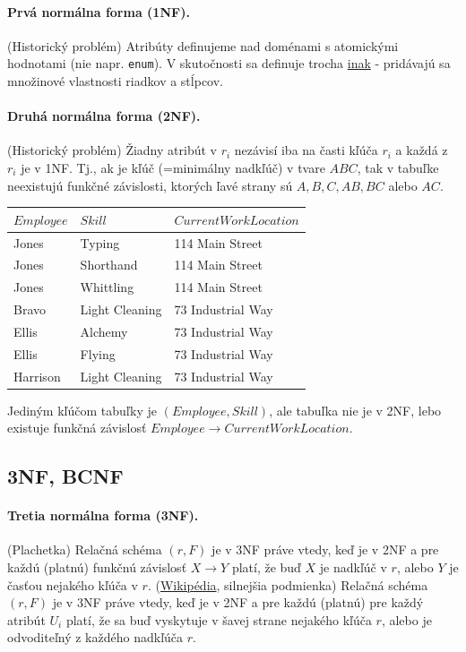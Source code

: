 \documentclass[10pt,a4paper]{article}
\begin{document}
\paragraph{Prvá normálna forma (1NF).} (Historický problém) Atribúty definujeme nad doménami s atomickými hodnotami (nie napr. \verb|enum|). V skutočnosti sa definuje trocha \href{http://en.wikipedia.org/wiki/First_normal_form}{inak} - pridávajú sa množinové vlastnosti riadkov a stĺpcov. 

\paragraph{Druhá normálna forma (2NF).} (Historický problém) Žiadny atribút v $r_i$ nezávisí iba na časti kľúča $r_i$ a každá z $r_i$ je v 1NF. Tj., ak je kľúč (=minimálny nadkľúč) v tvare $ABC$, tak v tabuľke neexistujú funkčné závislosti, ktorých ľavé strany sú $A,B,C,AB,BC$ alebo $AC$. 

\begin{center}
\begin{tabular}{l|l|l}
$Employee$ & $Skill$ & $Current Work Location$ \\
\hline
Jones &	Typing &	114 Main Street \\
Jones &	Shorthand &	114 Main Street \\
Jones &	Whittling &	114 Main Street \\
Bravo &	Light Cleaning &	73 Industrial Way \\
Ellis &	Alchemy &	73 Industrial Way \\
Ellis &	Flying &	73 Industrial Way \\
Harrison &	Light Cleaning &	73 Industrial Way \\
\end{tabular}
\end{center}

Jediným kľúčom tabuľky je $(Employee, Skill)$, ale tabuľka nie je v 2NF, lebo existuje funkčná závislosť $Employee \rightarrow Current Work Location$.

\subsection{3NF, BCNF}

\paragraph{Tretia normálna forma (3NF).} (Plachetka) Relačná schéma $(r,F)$ je v 3NF práve vtedy, keď je v 2NF a pre každú (platnú) funkčnú závislosť $X \rightarrow Y$ platí, že buď $X$ je nadkľúč v $r$, alebo $Y$ je časťou nejakého kľúča v $r$. 
(\href{http://en.wikipedia.org/wiki/Third_normal_form}{Wikipédia}, silnejšia podmienka) Relačná schéma $(r,F)$ je v 3NF práve vtedy, keď je v 2NF a pre každú (platnú) pre každý atribút $U_i$ platí, že sa buď vyskytuje v šavej strane nejakého kľúča $r$, alebo je odvoditeľný z každého nadkľúča $r$.
\end{document}
